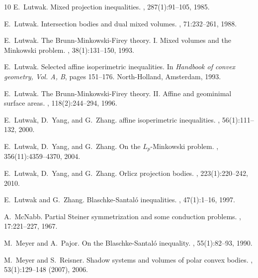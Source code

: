 \documentclass[11pt]{article}
\theoremstyle{definition}
\theoremstyle{proof}
\DeclareMathOperator{\+}{\mathop{\tilde{+}}}
\numberwithin{equation}{section}
\numberwithin{equation}{section}
\begin{document}
\begin{thebibliography}{10}
E.~Lutwak.
\newblock Mixed projection inequalities.
, 287(1):91--105, 1985.

E.~Lutwak.
\newblock Intersection bodies and dual mixed volumes.
, 71:232--261, 1988.

E.~Lutwak.
\newblock The {B}runn-{M}inkowski-{F}irey theory. {I}. {M}ixed volumes and the
  {M}inkowski problem.
, 38(1):131--150, 1993.

E.~Lutwak.
\newblock Selected affine isoperimetric inequalities.
\newblock In {\em Handbook of convex geometry, {V}ol. {A}, {B}}, pages
  151--176. North-Holland, Amsterdam, 1993.

E.~Lutwak.
\newblock The {B}runn-{M}inkowski-{F}irey theory. {II}. {A}ffine and geominimal
  surface areas.
, 118(2):244--294, 1996.

E.~Lutwak, D.~Yang, and G.~Zhang.
 affine isoperimetric inequalities.
, 56(1):111--132, 2000.

E.~Lutwak, D.~Yang, and G.~Zhang.
\newblock On the {$L_p$}-{M}inkowski problem.
, 356(11):4359--4370, 2004.

E.~Lutwak, D.~Yang, and G.~Zhang.
\newblock Orlicz projection bodies.
, 223(1):220--242, 2010.

E.~Lutwak and G.~Zhang.
\newblock Blaschke-{S}antal\'o inequalities.
, 47(1):1--16, 1997.

A.~McNabb.
\newblock Partial {S}teiner symmetrization and some conduction problems.
, 17:221--227, 1967.

M.~Meyer and A.~Pajor.
\newblock On the {B}laschke-{S}antal\'{o} inequality.
, 55(1):82--93, 1990.

M.~Meyer and S.~Reisner.
\newblock Shadow systems and volumes of polar convex bodies.
, 53(1):129--148 (2007), 2006.


\end{thebibliography}
\end{document}
